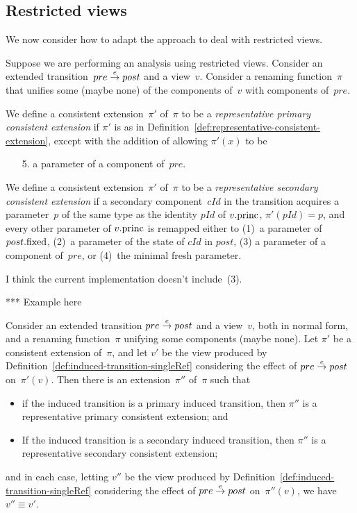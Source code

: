 \subsection{Restricted views}
\label{sec:effectOn-restricted}

We now consider how to adapt the approach to deal with restricted views.


\begin{definition} 
\label{def:representative-consistent-extension-singleRef}
Suppose we are performing an analysis using restricted views.  Consider an
extended transition~$pre \stackrel{e}\rightarrow post$ and a view~$v$.  Consider a renaming
function~$\pi$ that unifies some (maybe none) of the components of~$v$ with
components of~$pre$.  

We define a consistent extension~$\pi'$ of~$\pi$ to be a
\emph{representative primary consistent extension} if  $\pi'$ is as in
  Definition~\ref{def:representative-consistent-extension}, except with the
  addition of allowing $\pi'(x)$ to be
\begin{enumerate}
\item[5.] a parameter of a component of~$pre$.
\end{enumerate}

We define a consistent extension~$\pi'$ of~$\pi$ to be a \emph{representative
  secondary consistent extension} if a secondary component~$cId$ in the
transition acquires a parameter~$p$ of the same type as the identity $pId$ of
$v.\mathrm{princ}$, $\pi'(pId) = p$, and every other parameter of $v.\mathrm{princ}$ is
remapped either to (1)~a parameter of $post.\mathrm{fixed}$, (2)~a parameter of the
state of $cId$ in $post$, (3) a parameter of a component of~$pre$, or (4)~the
minimal fresh parameter.
\end{definition}

 I think the current implementation doesn't include~(3). 

*** Example here

\begin{prop}
Consider an extended transition $pre \stackrel{e}\rightarrow post$ and a view~$v$, both in
normal form, and a renaming function~$\pi$ unifying some components (maybe
none).  Let $\pi'$ be a consistent extension of~$\pi$, and let $v'$ be the
view produced by Definition~\ref{def:induced-transition-singleRef} considering
the effect of $pre \stackrel{e}\rightarrow post$ on~$\pi'(v)$.
%
Then there is an extension~$\pi''$ of~$\pi$ such that
%
\begin{itemize}
\item if the induced transition is a primary induced transition, then $\pi''$
  is a representative primary consistent extension; and

\item If the induced transition is a secondary induced transition, then $\pi''$
  is a representative secondary consistent extension; 
\end{itemize}
and in each case, letting $v''$ be the view produced by
Definition~\ref{def:induced-transition-singleRef} considering the effect of
$pre \stackrel{e}\rightarrow post$ on~$\pi''(v)$, we have $v'' \equiv v'$.
\end{prop}

